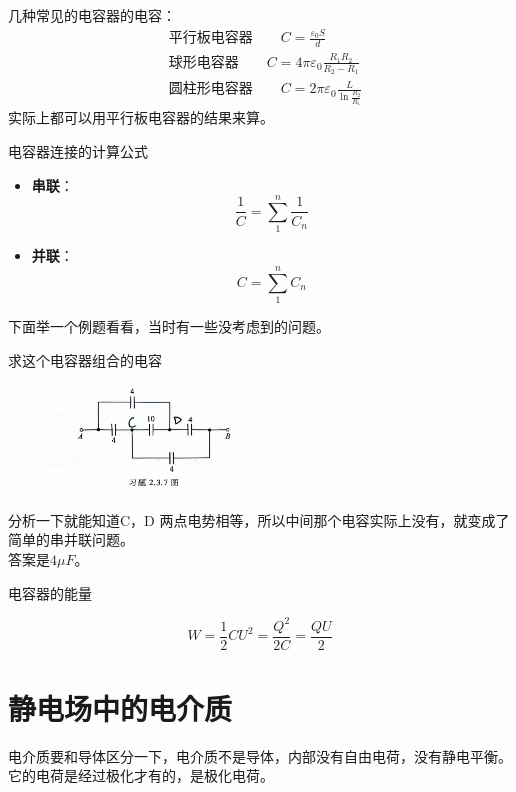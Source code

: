 \documentclass[cn,hazy,blue,14pt,normal]{elegantnote}
\numberwithin{equation}{section}
\begin{document}
几种常见的电容器的电容：
\begin{align}
	&\text{平行板电容器}\qquad
	C = \frac{\varepsilon_0S}{d}\\
	&\text{球形电容器}\qquad
	C = 4\pi\varepsilon_0\frac{R_1R_2}{R_2-R_1}\\
	&\text{圆柱形电容器}\qquad
	C = 2\pi\varepsilon_0\frac{L}{\ln\frac{R_2}{R_1}}
\end{align}
实际上都可以用平行板电容器的结果来算。\\
\begin{theorem}
	电容器连接的计算公式
\end{theorem}
\begin{itemize}
	\item \textbf{串联}：\begin{equation}\frac{1}{C}=\sum_{1}^{n}\frac{1}{C_n}\end{equation}
	\item \textbf{并联}：\begin{equation}C=\sum_{1}^{n}C_n\end{equation}
\end{itemize}
下面举一个例题看看，当时有一些没考虑到的问题。
\begin{example}
	求这个电容器组合的电容
\end{example}

\begin{figure}
	\includegraphics[width=0.5\textwidth]{image/电容器组合.jpg}
\end{figure}
分析一下就能知道C，D 两点电势相等，所以中间那个电容实际上没有，就变成了简单的串并联问题。\\
答案是$4\mu F$。
\begin{theorem}
	电容器的能量
\end{theorem}
\begin{equation}
	W = \frac{1}{2}CU^2 = \frac{Q^2}{2C} = \frac{QU}{2}
\end{equation}

\newpage
\section{静电场中的电介质}
电介质要和导体区分一下，电介质不是导体，内部没有自由电荷，没有静电平衡。\\
它的电荷是经过极化才有的，是极化电荷。
\newpage
\end{document}
